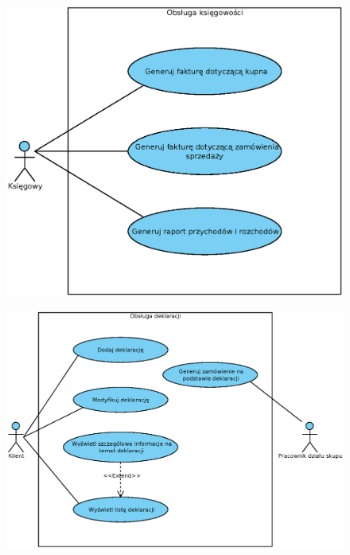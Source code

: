 \begin{figure}[H]
	\centering
	\includegraphics[width=.8\textwidth]{img/UC/ksiegowosc.eps}
\end{figure}
\begin{figure}[H]
	\centering
	\includegraphics[width=1.1\textwidth]{img/UC/deklaracje.eps}
\end{figure}